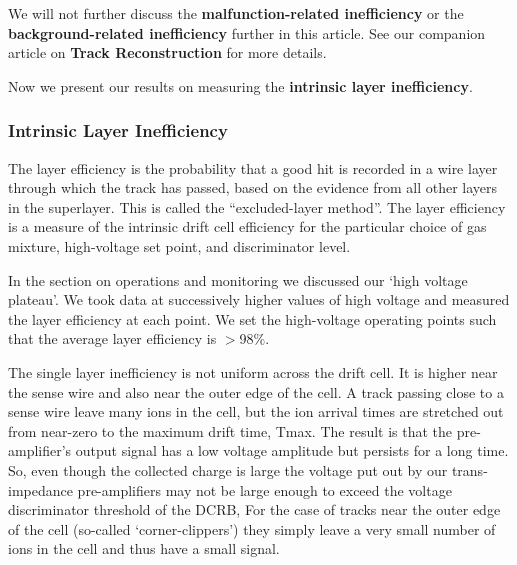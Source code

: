 We will not further discuss the {\bf malfunction-related inefficiency} or
the {\bf background-related inefficiency} further in this article.  See
our companion article on {\bf Track Reconstruction} for more details.

Now we present our results on measuring the {\bf intrinsic layer  inefficiency}.

\subsubsection{Intrinsic Layer Inefficiency}
The layer efficiency is the probability that a
good hit is recorded in a wire layer through which the track has passed, based on 
the evidence from all other layers in the superlayer.  This is called the 
``excluded-layer method''.  The layer efficiency is a measure of the intrinsic drift 
cell efficiency for the particular choice of gas mixture, high-voltage set point, and 
discriminator level.  

In the section on operations and monitoring we discussed our `high voltage plateau'.
We took data at successively higher values of high voltage and measured the
layer efficiency at each point.  We set the high-voltage operating points such that
the average layer efficiency is $>$98$\%$. 

The single layer inefficiency is not uniform across the drift cell.  It is higher near the sense wire and also near the outer
edge of the cell.  A track passing close to a sense wire leave many ions in the cell, but the ion arrival times are stretched
out from near-zero to the maximum drift time, Tmax.  The result is that the pre-amplifier's output signal has a low voltage
amplitude but persists for a long time.  So, even though the collected charge is large the voltage put out by our trans-impedance
pre-amplifiers may not be large enough to exceed the voltage discriminator threshold of the DCRB,
For the case of tracks near the outer edge of the cell (so-called `corner-clippers') they simply leave a very small number
of ions in the cell and thus have a small signal.

